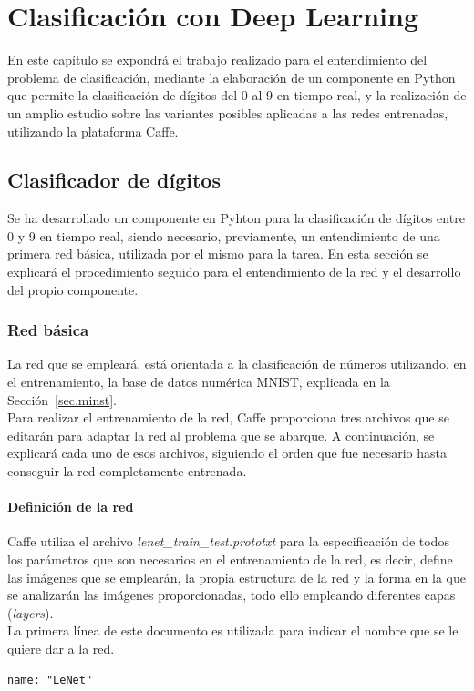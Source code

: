 \chapter{Clasificación con Deep Learning}\label{cap.clasificacion}
En este capítulo se expondrá el trabajo realizado para el entendimiento del problema de clasificación, mediante la elaboración de un componente en Python que permite la clasificación de dígitos del 0 al 9 en tiempo real, y la realización de un amplio estudio sobre las variantes posibles aplicadas a las redes entrenadas, utilizando la plataforma Caffe.\\
\section{Clasificador de dígitos}
Se ha desarrollado un componente en Pyhton para la clasificación de dígitos entre 0 y 9 en tiempo real, siendo necesario, previamente, un entendimiento de una primera red básica, utilizada por el mismo para la tarea. En esta sección se explicará el procedimiento seguido para el entendimiento de la red y el desarrollo del propio componente.\\
\subsection{Red básica}\label{sec.red}
La red que se empleará, está orientada a la clasificación de números utilizando, en el entrenamiento, la base de datos numérica MNIST, explicada en la Sección~\ref{sec.minst}.\\
Para realizar el entrenamiento de la red, Caffe proporciona tres archivos que se editarán para adaptar la red al problema que se abarque. A continuación, se explicará cada uno de esos archivos, siguiendo el orden que fue necesario hasta conseguir la red completamente entrenada.
\vspace{15pt}
\subsubsection{Definición de la red}
	Caffe utiliza el archivo 
	\textit{lenet\_train\_test.prototxt} para la especificación de todos los parámetros que son necesarios en el entrenamiento de la red, es decir, define las imágenes que se emplearán, la propia estructura de la red y la forma en la que se analizarán las imágenes proporcionadas, todo ello empleando diferentes capas (\textit{layers}).\\

	La primera línea de este documento es utilizada para indicar el nombre que se le quiere dar a la red.
	\vspace{10pt}
	\begin{lstlisting}[frame=single]
	name: "LeNet"
	\end{lstlisting}
	
